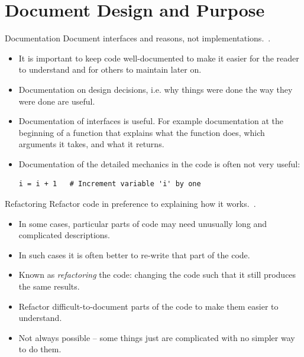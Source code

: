 \documentclass[english]{beamer}
\newcommand{\sectionslide}{\centering\vspace*{25mm}%
  {\bfseries\LARGE \insertsection}}
\begin{document}

\section{Document Design and Purpose}

\begin{frame}
  \sectionslide
\end{frame}


\begin{frame}[fragile]{\insertsection}{Documentation}
  Document interfaces and reasons, not
  implementations.~\cite{Wilson2013}.
  \begin{itemize}
  \item It is important to keep code well-documented to make it easier
    for the reader to understand and for others to maintain later on.
  \item Documentation on design decisions, i.e. why things were done
    the way they were done are useful.
  \item Documentation of interfaces is useful. For example
    documentation at the beginning of a function that explains what
    the function does, which arguments it takes, and what it returns.
  \item Documentation of the detailed mechanics in the code is often
    not very useful:
    \begin{lstlisting}[numbers=none]
i = i + 1   # Increment variable 'i' by one
    \end{lstlisting}
  \end{itemize}
\end{frame}


\begin{frame}{\insertsection}{Refactoring}
  Refactor code in preference to explaining how it
  works.~\cite{Wilson2013}.
  \begin{itemize}
  \item In some cases, particular parts of code may need unusually
    long and complicated descriptions.
  \item In such cases it is often better to re-write that part of the
    code.
  \item Known as \emph{refactoring} the code: changing the code such
    that it still produces the same results.
  \item Refactor difficult-to-document parts of the code to make them
    easier to understand.
  \item Not always possible -- some things just are complicated with
    no simpler way to do them.
  \end{itemize}
\end{frame}
\end{document}
